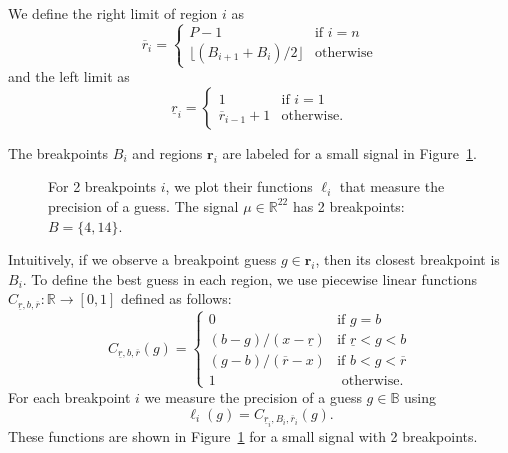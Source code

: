 \documentclass{jsfds} %
\renewcommand{\r}{ \mathbf{ r} }
\newcommand{\rileft}[1][i]{\underline r_{#1}}
\newcommand{\riright}[1][i]{\overline r_{#1}}
\newcommand{\RR}{\mathbb{R}}
\begin{document}
We define the right limit of region $i$ as
\begin{equation}
  \label{eq:R_i}
\riright
=
  \begin{cases}
    P-1 & \text{if } i=n \\
    \lfloor (B_{i+1}+B_i)/2 \rfloor & \text{otherwise}
  \end{cases}
\end{equation}
and
the left limit as
\begin{equation}
  \label{eq:L_i}
  \rileft =
  \begin{cases}
    1 & \text{if } i=1 \\
    \riright[i-1]+1 & \text{otherwise}.
  \end{cases}
\end{equation}

The breakpoints $B_i$ and regions $\r_i$ are labeled for a small
signal in Figure~\ref{fig:exact_imprecision}.

\begin{figure}[b]
  \centering
  
  \caption{For 2 breakpoints $i$, we plot their functions $\ell_i$
    that measure the precision of a guess.
    The signal $\mu\in\RR^{22}$ has 2 breakpoints: $B=\{4,14\}$.}
  \label{fig:exact_imprecision}
\end{figure}


Intuitively, if we observe a breakpoint guess $g\in \r_i$, then its
closest breakpoint is $B_i$. To define the best guess in each region,
we use piecewise linear functions $C_{\underline r,b,\overline r}:\RR\rightarrow[0,1]$
defined as follows:
\begin{equation}
  \label{eq:cLxR}
  C_{\underline r,b,\overline r}(g) =
  \begin{cases}
    0 & \text{if }g=b \\
    (b-g)/(x-\underline r) & \text{if } \underline r< g< b \\
    (g-b)/(\overline r-x) & \text{if } b< g< \overline r\\
    1 & \text{ otherwise}.
  \end{cases}
\end{equation}
For each breakpoint $i$ we measure the precision of a guess
$g\in\mathbb B$ using
\begin{equation}
  \label{eq:ell_i_exact}
  \ell_i(g)=C_{\rileft,B_i,\riright}(g).
\end{equation}
These functions are shown in Figure~\ref{fig:exact_imprecision} for a
small signal with 2 breakpoints.
\end{document}
